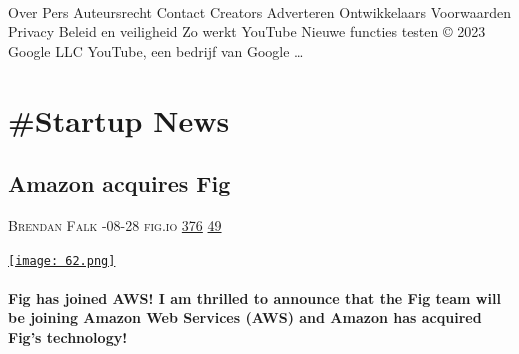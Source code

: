\documentclass[10pt,a4paper]{article}
\begin{document}
\begin{multicols}{2}
\paragraph{}
Over
Pers
Auteursrecht
Contact
Creators
Adverteren
Ontwikkelaars
Voorwaarden
Privacy
Beleid en veiligheid
Zo werkt YouTube
Nieuwe functies testen
© 2023 Google LLC
YouTube, een bedrijf van Google
\dots\par
\end{multicols}

\newpage
\section{\#Startup News}

\begin{multicols}{2}
\raggedcolumns
\noindent\begin{minipage}{\linewidth}
\medskip
\subsection{Amazon acquires Fig}
\textsc{\footnotesize
{\scriptsize\faUser}\space 
Brendan Falk 
{\scriptsize\faCalendar}-08-28 
{\scriptsize\faGlobe}\space 
fig.io 
{\scriptsize\faThumbsOUp}\space 
\href{http://news.ycombinator.com/item?id=37296401\&utm\_term=comment}{376} 
{\scriptsize\faComments}\space 
\href{http://news.ycombinator.com/item?id=37296401\&utm\_term=comment}{49} 
}
\par\medskip\noindent
\href{https://fig.io/blog/post/fig-joins-aws?utm\_source=hackernewsletter\&utm\_medium=email\&utm\_term=startup\_news}{
    \texttt{[image: 62.png]}
}
\end{minipage}
\paragraph{}
\textbf{Fig has joined AWS!
I am thrilled to announce that the Fig team will be joining Amazon Web Services (AWS) and Amazon has acquired Fig's technology!}
\paragraph{}


\end{multicols}
\end{document}
